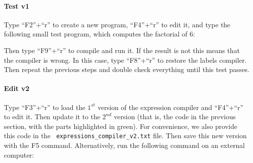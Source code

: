
\medskip \paragraph{Test v1} Type ``F2''+``r'' to create a new program,
``F4''+``r'' to edit it, and type the following small test program, which
computes the factorial of 6:


\noindent Then type ``F9''+``r'' to compile and run it. If the result is not
 this means that the compiler is wrong. In this case, type
``F8''+``r'' to restore the labels compiler. Then repeat the previous steps and
double check everything until this test passes.


\medskip \paragraph*{Edit v2} Type ``F3''+``r'' to load the $1^{st}$ version of
the expression compiler and ``F4''+``r'' to edit it. Then update it to the
$2^{nd}$ version (that is, the code in the previous section, with the parts
highlighted in green). For convenience, we also provide this code in the {\tt
expressions\_compiler\_v2.txt} file. Then save this new version with the F5
command. Alternatively, run the following command on an external computer:

